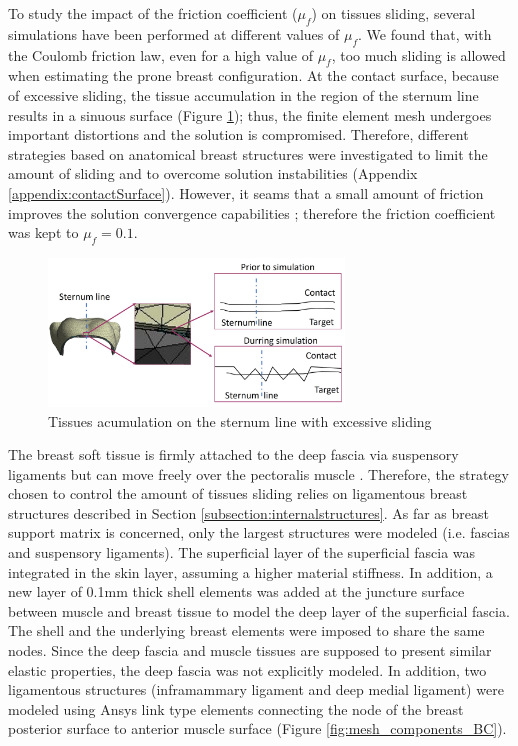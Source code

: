 To study the impact of the friction coefficient ($\mu_f$) on tissues sliding, several simulations have been performed at different values of $\mu_f$. We found that, with the Coulomb friction law, even for a high value of $\mu_f$, too much sliding is allowed when estimating the prone breast configuration. At the contact surface, because of excessive sliding, the tissue accumulation in the region of the sternum line results in a sinuous surface (Figure \ref{fig:overslidingProblem}); thus, the finite element mesh  undergoes important distortions and the solution is compromised. Therefore, different strategies based on anatomical breast structures were investigated to limit the amount of sliding and to overcome solution instabilities (Appendix \ref{appendix:contactSurface}). However, it seams that a small amount of friction improves the solution convergence capabilities \citep{ansys_contact_2017}; therefore the friction coefficient was kept to $\mu_f = 0.1$. 
\begin{figure}[!h]
\centering
\includegraphics[width=0.7\textwidth,keepaspectratio]{figures/overslidingProblem.jpg} 
\caption{Tissues acumulation on the sternum line with excessive sliding}\label{fig:overslidingProblem}
\end{figure}
 
The breast soft tissue is firmly attached to the deep fascia via suspensory ligaments but can move freely over the pectoralis muscle  \citep{mugea2014aesthetic,clemente2011anatomy}. Therefore, the strategy chosen to control the amount of tissues sliding relies on ligamentous breast structures described in Section \ref{subsection:internalstructures}. As far as  breast support matrix is concerned, only the largest structures were modeled (i.e. fascias and suspensory ligaments).  The superficial layer of the superficial fascia was integrated in the skin layer, assuming a higher material stiffness. In addition, a new layer of 0.1mm thick shell elements was added at the juncture surface between muscle and breast tissue to model the deep layer of the superficial fascia. The shell and the underlying breast elements were imposed to share the same nodes. Since the deep fascia and muscle tissues are supposed to present similar elastic properties, the deep fascia was not explicitly modeled. In addition, two ligamentous structures (inframammary ligament and deep medial ligament) were modeled using Ansys link type elements connecting the node of the breast posterior surface to anterior muscle surface (Figure \ref{fig:mesh_components_BC}).  


